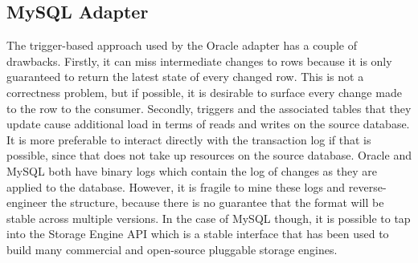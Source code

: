 \subsection{MySQL Adapter}
The trigger-based approach used by the Oracle adapter has a couple of drawbacks. Firstly, it can miss intermediate changes to rows because it is only guaranteed to return the latest state of every changed row. This is not a correctness problem, but if possible, it is desirable to surface every change made to the row to the consumer.
Secondly, triggers and the associated tables that they update cause additional load in terms of reads and writes on the source database. 
It is more preferable to interact directly with the transaction log if that is possible, since that does not take up resources on the source database.
Oracle and MySQL both have binary logs which contain the log of changes as they are applied to the database. However, it is fragile to mine these logs and reverse-engineer the structure, because there is no guarantee that the format will be stable across multiple versions. In the case of MySQL though, it is possible to tap into the Storage Engine API which is a stable interface that has been used to build many commercial and open-source pluggable storage engines.


